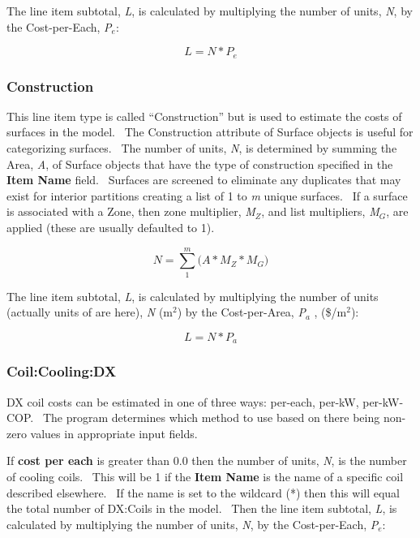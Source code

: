 The line item subtotal, \emph{L}, is calculated by multiplying the number of units, \emph{N}, by the Cost-per-Each, \emph{P\(_{e}\)}:

\begin{equation}
L = N * {P_e}
\end{equation}

\subsubsection{Construction}\label{construction}

This line item type is called ``Construction'' but is used to estimate the costs of surfaces in the model.~ The Construction attribute of Surface objects is useful for categorizing surfaces.~ The number of units, \emph{N}, is determined by summing the Area, \emph{A}, of Surface objects that have the type of construction specified in the \textbf{Item Name} field.~ Surfaces are screened to eliminate any duplicates that may exist for interior partitions creating a list of 1 to \emph{m} unique surfaces.~ If a surface is associated with a Zone, then zone multiplier, \emph{M\(_{Z}\)}, and list multipliers, \emph{M\(_{G}\)}, are applied (these are usually defaulted to 1).

\begin{equation}
N = \sum\limits_1^m {(A*{M_Z} * {M_G}} )
\end{equation}

The line item subtotal, \emph{L}, is calculated by multiplying the number of units (actually units of are here), \emph{N} (m\(^{2}\)) by the Cost-per-Area, \emph{P\(_{a}\)} , (\$/m\(^{2}\)):

\begin{equation}
L = N * {P_a}
\end{equation}

\subsubsection{Coil:Cooling:DX}\label{coilcoolingdx}

DX coil costs can be estimated in one of three ways: per-each, per-kW, per-kW-COP.~ The program determines which method to use based on there being non-zero values in appropriate input fields.

If \textbf{cost per each} is greater than 0.0 then the number of units, \emph{N}, is the number of cooling coils.~ This will be 1 if the \textbf{Item Name} is the name of a specific coil described elsewhere.~ If the name is set to the wildcard (*) then this will equal the total number of DX:Coils in the model.~ Then the line item subtotal, \emph{L}, is calculated by multiplying the number of units, \emph{N}, by the Cost-per-Each, \emph{P\(_{e}\)}:

